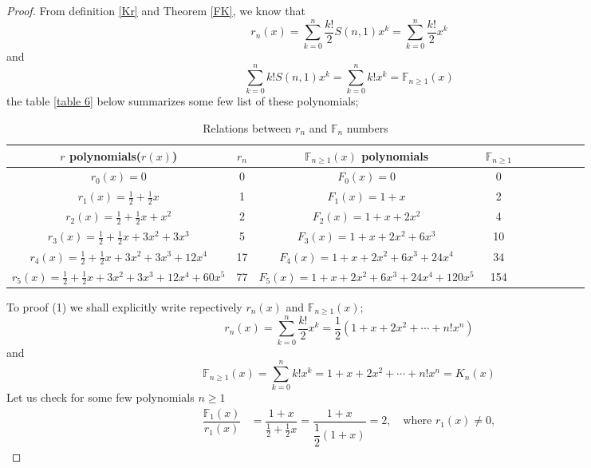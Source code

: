 \documentclass[pdflatex,sn-mathphys-num]{sn-jnl}%
\theoremstyle{thmstyleone}%
\theoremstyle{thmstyletwo}%
\theoremstyle{thmstylethree}%
\begin{document}
\begin{proof}
From definition \ref{Kr} and Theorem \ref{FK}, we know that 
 \begin{equation*}
r_{n}(x)=\sum_{k=0}^n \frac{k!}{2} S(n,1)x^k=\sum_{k=0}^n \frac{k!}{2}x^k
 \end{equation*}
 and 
 \begin{equation*}
\sum_{k=0}^n k! S(n,1)x^k=\sum_{k=0}^n k!x^k=\mathbb{F}_{n\geq 1}(x)
 \end{equation*}
the table \ref{table 6} below summarizes some few list of these polynomials;
\begin{table}[!ht]
    \centering
    \begin{tabular}{|c|c|c|c|c|a|c|c|c|c|}\hline 
        $r$ polynomials($r(x)$)& $r_n$&$\mathbb{F}_{n\geq 1}(x)$ polynomials & $\mathbb{F}_{n\geq 1}$  \\\hline 
         $r_0(x) = 0$ & $0$ &$F_0(x) = 0$& 0\\\hline
        $r_1(x) = \frac{1}{2}+ \frac{1}{2}x$ & 1&$F_1(x) = 1 + x$ & 2\\\hline
          $r_2(x) = \frac{1}{2}+ \frac{1}{2}x + x^2$ &2 & $F_2(x) = 1 + x + 2x^2$ & 4\\\hline
            $r_3(x) = \frac{1}{2}+ \frac{1}{2}x + 3x^2 + 3x^3$ &5 & $F_3(x) = 1 + x + 2x^2 + 6x^3$ & 10\\\hline
              $r_4(x) = \frac{1}{2}+ \frac{1}{2}x + 3x^2 + 3x^3 + 12x^4$ &17 & $F_4(x) = 1 + x + 2x^2 + 6x^3 + 24x^4$ & 34 \\\hline
                $r_5(x) = \frac{1}{2}+ \frac{1}{2}x + 3x^2 + 3x^3 + 12x^4+ 60x^5$ &77 & $F_5(x) = 1 + x + 2x^2 + 6x^3 + 24x^4 + 120x^5$ & 154 \\\hline
    \end{tabular}
    \caption{Relations between $r_n$ and $\mathbb{F}_{n}$ numbers \cite{OEIS:A003422} }
    \label{table 7}
\end{table}
To proof (1) we shall explicitly write repectively $r_n(x)$ and $\mathbb{F}_{n\geq 1}(x)$;
 \begin{equation*}
r_{n}(x)=\sum_{k=0}^n \frac{k!}{2}x^k=\dfrac{1}{2}\left(1+x+2x^2+\cdots+n!x^n \right)
 \end{equation*}
 and 
 \begin{equation*}
    \mathbb{F}_{n\geq1}(x)= \sum_{k=0}^n k! x^k=1+x+2x^2+\cdots+n!x^n=K_n(x)
 \end{equation*}
Let us check for some few polynomials $n\geq1$
\begin{align*}
    \dfrac{\mathbb{F}_{1}(x)}{r_1(x)}&=\dfrac{1 + x}{\frac{1}{2}+ \frac{1}{2}x}
    =\dfrac{ 1+x}{\dfrac{1}{2}\left(1+x \right)}=2, \quad \mbox{where $r_1(x) \neq 0$},
\end{align*}



\end{proof}
\end{document}
